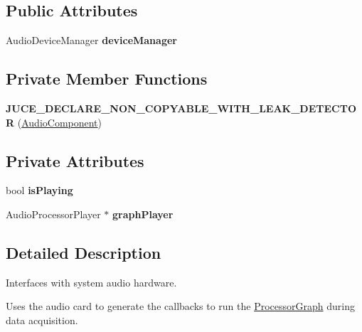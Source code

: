 \subsection*{Public Attributes}
\begin{DoxyCompactItemize}
\item 
\hypertarget{classAudioComponent_a84f78369c478a8531a258ba8683033e1}{Audio\-Device\-Manager {\bfseries device\-Manager}}\label{classAudioComponent_a84f78369c478a8531a258ba8683033e1}

\end{DoxyCompactItemize}
\subsection*{Private Member Functions}
\begin{DoxyCompactItemize}
\item 
\hypertarget{classAudioComponent_a7a880353dbbe26c1e6ab830bea62d340}{{\bfseries J\-U\-C\-E\-\_\-\-D\-E\-C\-L\-A\-R\-E\-\_\-\-N\-O\-N\-\_\-\-C\-O\-P\-Y\-A\-B\-L\-E\-\_\-\-W\-I\-T\-H\-\_\-\-L\-E\-A\-K\-\_\-\-D\-E\-T\-E\-C\-T\-O\-R} (\hyperlink{classAudioComponent}{Audio\-Component})}\label{classAudioComponent_a7a880353dbbe26c1e6ab830bea62d340}

\end{DoxyCompactItemize}
\subsection*{Private Attributes}
\begin{DoxyCompactItemize}
\item 
\hypertarget{classAudioComponent_afc6f4562aa55d071a5f2a9607899ee91}{bool {\bfseries is\-Playing}}\label{classAudioComponent_afc6f4562aa55d071a5f2a9607899ee91}

\item 
\hypertarget{classAudioComponent_adebf82b36bfd76e3bfd9bbe3d40d4dad}{Audio\-Processor\-Player $\ast$ {\bfseries graph\-Player}}\label{classAudioComponent_adebf82b36bfd76e3bfd9bbe3d40d4dad}

\end{DoxyCompactItemize}


\subsection{Detailed Description}
Interfaces with system audio hardware.

Uses the audio card to generate the callbacks to run the \hyperlink{classProcessorGraph}{Processor\-Graph} during data acquisition.

